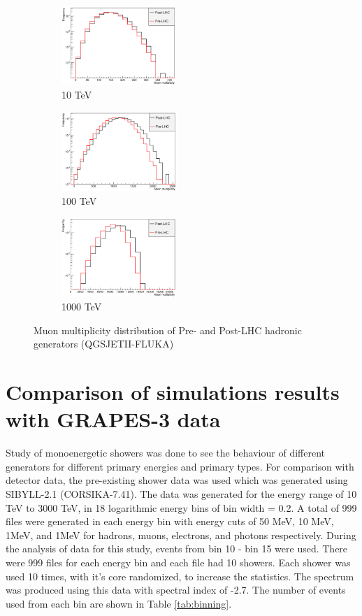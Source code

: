\documentclass[12pt]{article}
\begin{document}
\begin{figure}[h]
\begin{subfigure}{0.32\textwidth}
\includegraphics[width=0.9\linewidth, height=3cm]{qgsii-lhc-mm10} 
\caption{10 TeV}
\label{fig:qgsii-lhc-mm10}
\end{subfigure}
\begin{subfigure}{0.32\textwidth}
\includegraphics[width=0.9\linewidth, height=3cm]{qgsii-lhc-mm100} 
\caption{100 TeV}
\label{fig:qgsii-lhc-mm100}
\end{subfigure}
\begin{subfigure}{0.32\textwidth}
\includegraphics[width=0.9\linewidth, height = 3cm]{qgsii-lhc-mm1000} 
\caption{1000 TeV}
\label{fig:qgsii-lhc-mm1000}
\end{subfigure}
\caption{Muon multiplicity distribution of Pre- and Post-LHC hadronic generators (QGSJETII-FLUKA)}
\label{fig:lhc_multiplicity_qgsii}
\end{figure}

\section{Comparison of simulations results with GRAPES-3 data}
Study of monoenergetic showers was done to see the behaviour of different generators for different primary energies and primary types. For comparison with detector data, the pre-existing shower data was used which was generated using SIBYLL-2.1 (CORSIKA-7.41). The data was generated for the energy range of 10 TeV to 3000 TeV, in 18 logarithmic energy bins of bin width = 0.2. A total of 999 files were generated in each energy bin with energy cuts of 50 MeV, 10 MeV, 1MeV, and 1MeV for hadrons, muons, electrons, and photons respectively. During the analysis of data for this study, events from bin 10 - bin 15 were used. There were 999 files for each energy bin and each file had 10 showers. Each shower was used 10 times, with it's core randomized, to increase the statistics. The spectrum was produced using this data with spectral index of -2.7. The number of events used from each bin are shown in Table \ref{tab:binning}. 
\end{document}
